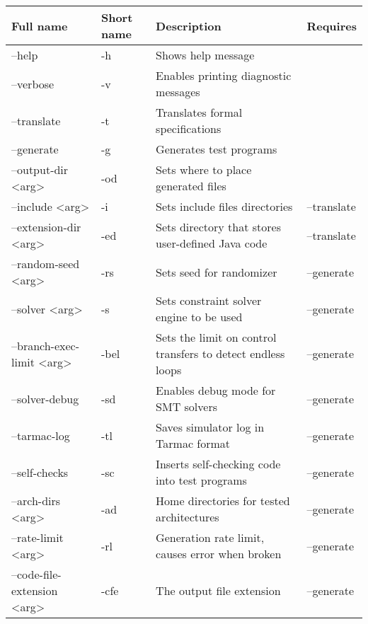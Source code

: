 \documentclass[oneside,final,12pt]{extreport}
\begin{document}
\begin{tabular}{ | p{4cm} | p{1cm} | p{5cm} | p{2.5cm} |}
  \hline
  \textbf{Full name} & \textbf{Short name} & \textbf{Description} & \textbf{Requires} \\ \hline
  --help & -h & Shows help message & \\ \hline
  --verbose & -v & Enables printing diagnostic messages & \\ \hline
  --translate & -t & Translates formal specifications & \\ \hline
  --generate & -g & Generates test programs & \\ \hline
  --output-dir <arg> & -od & Sets where to place generated files & \\ \hline
  --include <arg> & -i & Sets include files directories & --translate \\ \hline
  --extension-dir <arg> & -ed & Sets directory that stores user-defined Java code & --translate \\ \hline
  --random-seed <arg> & -rs & Sets seed for randomizer & --generate \\ \hline
  --solver <arg> & -s & Sets constraint solver engine to be used & --generate \\ \hline
  --branch-exec-limit <arg> & -bel & Sets the limit on control transfers to detect endless loops & --generate \\ \hline
  --solver-debug & -sd & Enables debug mode for SMT solvers & --generate \\ \hline
  --tarmac-log & -tl & Saves simulator log in Tarmac format & --generate \\ \hline
  --self-checks & -sc & Inserts self-checking code into test programs & --generate \\ \hline
  --arch-dirs <arg> & -ad & Home directories for tested architectures & --generate \\ \hline
  --rate-limit <arg> & -rl & Generation rate limit, causes error when broken & --generate \\ \hline
  --code-file-extension <arg> & -cfe & The output file extension & --generate \\ \hline
\end{tabular}
\end{document}
